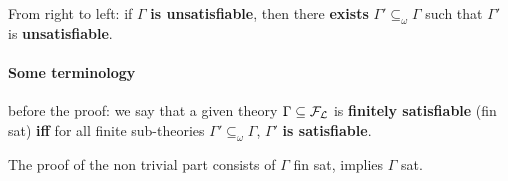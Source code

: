 	From right to left: if $\Gamma$ \textbf{is unsatisfiable}, then there \textbf{exists} $\Gamma' \subseteq_\omega \Gamma$ such that $\Gamma'$ is \textbf{unsatisfiable}.\\

	\newpage

	\paragraph{Some terminology} before the proof: we say that a given theory $\Gamma \subseteq \mathcal{F}_\mathcal{L}$ is \textbf{finitely satisfiable} (fin sat) \textbf{iff} for all finite sub-theories $\Gamma' \subseteq_\omega \Gamma$, $\Gamma'$ \textbf{is satisfiable}.

	The proof of the non trivial part consists of $\Gamma$ fin sat, implies $\Gamma$ sat.\\

